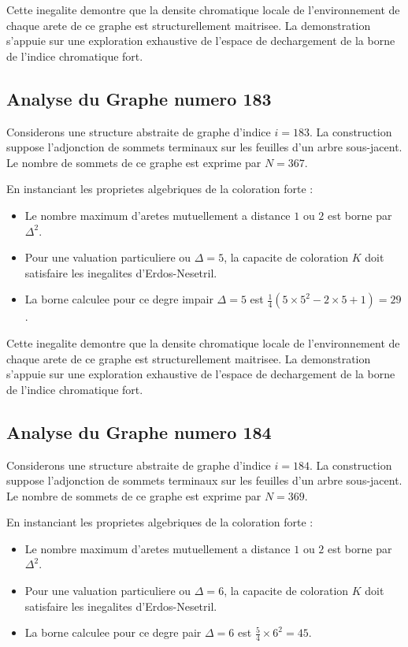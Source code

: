 \documentclass[11pt,a4paper]{article}
\begin{document}
Cette inegalite demontre que la densite chromatique locale de l'environnement de chaque arete de ce graphe est structurellement maitrisee. La demonstration s'appuie sur une exploration exhaustive de l'espace de dechargement de la borne de l'indice chromatique fort.

\subsection{Analyse du Graphe numero 183}
Considerons une structure abstraite de graphe d'indice $i = 183$. La construction suppose l'adjonction de sommets terminaux sur les feuilles d'un arbre sous-jacent. Le nombre de sommets de ce graphe est exprime par $N = 367$.

En instanciant les proprietes algebriques de la coloration forte :
\begin{itemize}
\item Le nombre maximum d'aretes mutuellement a distance $1$ ou $2$ est borne par $\Delta^2$.
\item Pour une valuation particuliere ou $\Delta = 5$, la capacite de coloration $K$ doit satisfaire les inegalites d'Erdos-Nesetril.
\item La borne calculee pour ce degre impair $\Delta = 5$ est $\frac{1}{4}(5 \times 5^2 - 2 \times 5 + 1) = 29$.
\end{itemize}

Cette inegalite demontre que la densite chromatique locale de l'environnement de chaque arete de ce graphe est structurellement maitrisee. La demonstration s'appuie sur une exploration exhaustive de l'espace de dechargement de la borne de l'indice chromatique fort.

\subsection{Analyse du Graphe numero 184}
Considerons une structure abstraite de graphe d'indice $i = 184$. La construction suppose l'adjonction de sommets terminaux sur les feuilles d'un arbre sous-jacent. Le nombre de sommets de ce graphe est exprime par $N = 369$.

En instanciant les proprietes algebriques de la coloration forte :
\begin{itemize}
\item Le nombre maximum d'aretes mutuellement a distance $1$ ou $2$ est borne par $\Delta^2$.
\item Pour une valuation particuliere ou $\Delta = 6$, la capacite de coloration $K$ doit satisfaire les inegalites d'Erdos-Nesetril.
\item La borne calculee pour ce degre pair $\Delta = 6$ est $\frac{5}{4} \times 6^2 = 45$.
\end{itemize}
\end{document}
